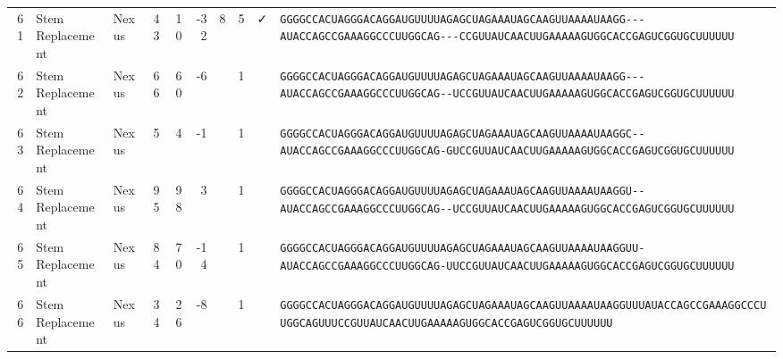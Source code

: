\begin{tabular}{rllrrrrrcl}
 61 & Stem Replacement & Nexus & 43 & 10 & -32 & 8 & 5 & ✓ &
 \color{ucsfdarkgrey}\verb|GGGGCCACUAGGGACAGGAU|\color{ucsforange}\verb|GUUUUA|\color{ucsfblue}\verb|GAGCUAGAAAUAGCAAGU|\color{ucsforange}\verb|UAAAAUAA|\color{ucsfnavy}\verb|GG---|\color{ucsfpurple}\verb|AUACCAGCCGAAAGGCCCUUGGCAG|\color{ucsfnavy}\verb|---CCGU|\color{ucsforange}\verb|UAUCA|\color{ucsfteal}\verb|ACUUGAAAAAGU|\color{ucsforange}\verb|GGCACCGAGUCGGUGCUUUUUU| \\

 62 & Stem Replacement & Nexus & 66 & 60 & -6 &  & 1 &  &
 \color{ucsfdarkgrey}\verb|GGGGCCACUAGGGACAGGAU|\color{ucsforange}\verb|GUUUUA|\color{ucsfblue}\verb|GAGCUAGAAAUAGCAAGU|\color{ucsforange}\verb|UAAAAUAA|\color{ucsfnavy}\verb|GG---|\color{ucsfpurple}\verb|AUACCAGCCGAAAGGCCCUUGGCAG|\color{ucsfnavy}\verb|--UCCGU|\color{ucsforange}\verb|UAUCA|\color{ucsfteal}\verb|ACUUGAAAAAGU|\color{ucsforange}\verb|GGCACCGAGUCGGUGCUUUUUU| \\

 63 & Stem Replacement & Nexus & 5 & 4 & -1 &  & 1 &  &
 \color{ucsfdarkgrey}\verb|GGGGCCACUAGGGACAGGAU|\color{ucsforange}\verb|GUUUUA|\color{ucsfblue}\verb|GAGCUAGAAAUAGCAAGU|\color{ucsforange}\verb|UAAAAUAA|\color{ucsfnavy}\verb|GGC--|\color{ucsfpurple}\verb|AUACCAGCCGAAAGGCCCUUGGCAG|\color{ucsfnavy}\verb|-GUCCGU|\color{ucsforange}\verb|UAUCA|\color{ucsfteal}\verb|ACUUGAAAAAGU|\color{ucsforange}\verb|GGCACCGAGUCGGUGCUUUUUU| \\

 64 & Stem Replacement & Nexus & 95 & 98 & 3 &  & 1 &  &
 \color{ucsfdarkgrey}\verb|GGGGCCACUAGGGACAGGAU|\color{ucsforange}\verb|GUUUUA|\color{ucsfblue}\verb|GAGCUAGAAAUAGCAAGU|\color{ucsforange}\verb|UAAAAUAA|\color{ucsfnavy}\verb|GGU--|\color{ucsfpurple}\verb|AUACCAGCCGAAAGGCCCUUGGCAG|\color{ucsfnavy}\verb|--UCCGU|\color{ucsforange}\verb|UAUCA|\color{ucsfteal}\verb|ACUUGAAAAAGU|\color{ucsforange}\verb|GGCACCGAGUCGGUGCUUUUUU| \\

 65 & Stem Replacement & Nexus & 84 & 70 & -14 &  & 1 &  &
 \color{ucsfdarkgrey}\verb|GGGGCCACUAGGGACAGGAU|\color{ucsforange}\verb|GUUUUA|\color{ucsfblue}\verb|GAGCUAGAAAUAGCAAGU|\color{ucsforange}\verb|UAAAAUAA|\color{ucsfnavy}\verb|GGUU-|\color{ucsfpurple}\verb|AUACCAGCCGAAAGGCCCUUGGCAG|\color{ucsfnavy}\verb|-UUCCGU|\color{ucsforange}\verb|UAUCA|\color{ucsfteal}\verb|ACUUGAAAAAGU|\color{ucsforange}\verb|GGCACCGAGUCGGUGCUUUUUU| \\

 66 & Stem Replacement & Nexus & 34 & 26 & -8 &  & 1 &  &
 \color{ucsfdarkgrey}\verb|GGGGCCACUAGGGACAGGAU|\color{ucsforange}\verb|GUUUUA|\color{ucsfblue}\verb|GAGCUAGAAAUAGCAAGU|\color{ucsforange}\verb|UAAAAUAA|\color{ucsfnavy}\verb|GGUUU|\color{ucsfpurple}\verb|AUACCAGCCGAAAGGCCCUUGGCAG|\color{ucsfnavy}\verb|UUUCCGU|\color{ucsforange}\verb|UAUCA|\color{ucsfteal}\verb|ACUUGAAAAAGU|\color{ucsforange}\verb|GGCACCGAGUCGGUGCUUUUUU| \\


\end{tabular}
